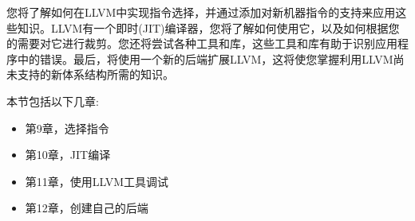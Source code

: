 您将了解如何在LLVM中实现指令选择，并通过添加对新机器指令的支持来应用这些知识。LLVM有一个即时(JIT)编译器，您将了解如何使用它，以及如何根据您的需要对它进行裁剪。您还将尝试各种工具和库，这些工具和库有助于识别应用程序中的错误。最后，将使用一个新的后端扩展LLVM，这将使您掌握利用LLVM尚未支持的新体系结构所需的知识。 \par

本节包括以下几章:\par

\begin{itemize}
	\item 第9章，选择指令
	\item 第10章，JIT编译
	\item 第11章，使用LLVM工具调试
	\item 第12章，创建自己的后端
\end{itemize}

\newpage